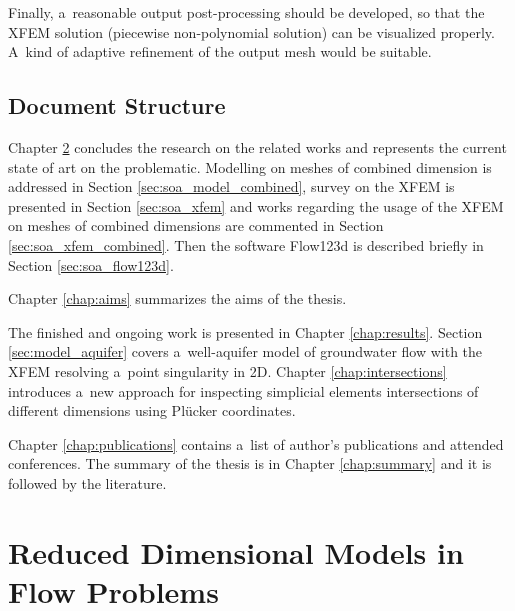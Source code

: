 \documentclass[bibliography=totocnumbered,dvipsnames,FM,Dis]{tulthesis}
\begin{document}
Finally, a~reasonable output post-processing should be developed, so that the XFEM solution (piecewise non-polynomial solution)
can be visualized properly. A~kind of adaptive refinement of the output mesh would be suitable.


\section{Document Structure} \label{sec:structure}

Chapter \ref{chap:soa} concludes the research on the related works and represents the current state of art
on the problematic. Modelling on meshes of combined dimension is addressed in Section \ref{sec:soa_model_combined},
survey on the XFEM is presented in Section \ref{sec:soa_xfem} and works regarding the usage of the XFEM on
meshes of combined dimensions are commented in Section \ref{sec:soa_xfem_combined}. Then 
the software Flow123d is described briefly in Section \ref{sec:soa_flow123d}.

Chapter \ref{chap:aims} summarizes the aims of the thesis.

The finished and ongoing work is presented in Chapter \ref{chap:results}. Section \ref{sec:model_aquifer} 
covers a~well-aquifer model of groundwater flow with the XFEM resolving a~point singularity in 2D.
Chapter \ref{chap:intersections} introduces a~new approach for inspecting simplicial elements intersections
of different dimensions using Pl{\"u}cker coordinates.

Chapter \ref{chap:publications} contains a~list of author's publications and attended conferences.
The summary of the thesis is in Chapter \ref{chap:summary} and it is followed by the literature.




\chapter{Reduced Dimensional Models in Flow Problems} \label{chap:soa}


\end{document}
